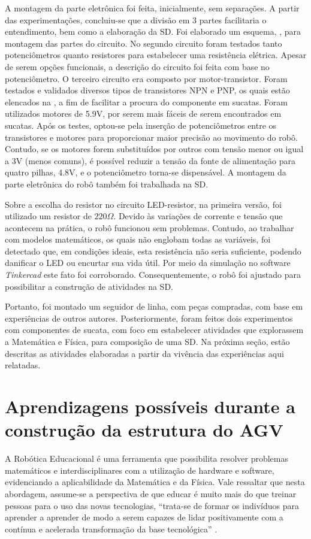 \documentclass{textolivre}
\begin{document}
A montagem da parte eletrônica foi feita, inicialmente, sem separações. A
partir das experimentações, concluiu-se que a divisão em 3 partes facilitaria o
entendimento, bem como a elaboração da SD. Foi elaborado um esquema, ,
para montagem das partes do circuito. No segundo circuito foram testados tanto
potenciômetros quanto resistores para estabelecer uma resistência elétrica.
Apesar de serem opções funcionais, a descrição do circuito foi feita com base
no potenciômetro. O terceiro circuito era composto por motor-transistor. Foram
testados e validados diversos tipos de transistores NPN e PNP, os quais estão
elencados na , a fim de facilitar a procura do componente em sucatas.
Foram utilizados motores de 5.9V, por serem mais fáceis de serem encontrados em
sucatas. Após os testes, optou-se pela inserção de potenciômetros entre os
transistores e motores para proporcionar maior precisão ao movimento do robô.
Contudo, se os motores forem substituídos por outros com tensão menor ou igual
a 3V (menos comuns), é possível reduzir a tensão da fonte de alimentação para
quatro pilhas, 4.8V, e o potenciômetro torna-se dispensável. A montagem da
parte eletrônica do robô também foi trabalhada na SD.

Sobre a escolha do resistor no circuito LED-resistor, na primeira versão, foi
utilizado um resistor de $220\Omega$. Devido às variações de corrente e tensão que
acontecem na prática, o robô funcionou sem problemas. Contudo, ao trabalhar com
modelos matemáticos, os quais não englobam todas as variáveis, foi detectado
que, em condições ideais, esta resistência não seria suficiente, podendo
danificar o LED ou encurtar sua vida útil. Por meio da simulação no software
\emph{Tinkercad} este fato foi corroborado. Consequentemente, o robô foi ajustado para
possibilitar a construção de atividades na SD.

Portanto, foi montado um seguidor de linha, com peças compradas, com base em
experiências de outros autores. Posteriormente, foram feitos dois experimentos
com componentes de sucata, com foco em estabelecer atividades que explorassem a
Matemática e Física, para composição de uma SD. Na próxima seção, estão
descritas as atividades elaboradas a partir da vivência das experiências aqui
relatadas.

\section{Aprendizagens possíveis durante a construção da estrutura do AGV}\label{sec-aprendizagens}
A Robótica Educacional é uma ferramenta que possibilita resolver problemas
matemáticos e interdisciplinares com a utilização de hardware e software,
evidenciando a aplicabilidade da Matemática e da Física. Vale ressaltar que
nesta abordagem, assume-se a perspectiva de que educar é muito mais do que
treinar pessoas para o uso das novas tecnologias, “trata-se de formar os
indivíduos para aprender a aprender de modo a serem capazes de lidar
positivamente com a contínua e acelerada transformação da base tecnológica”
\cite[p. 45]{brasil2000}.
\end{document}
